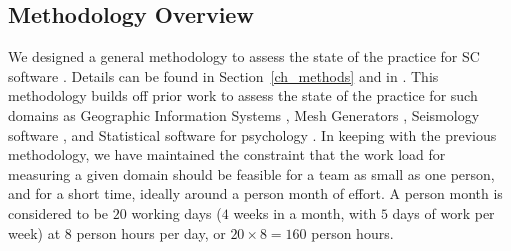 \documentclass[final, 3p, times, authoryear]{elsarticle}
\begin{document}

\subsection{Methodology Overview}

We designed a general methodology to assess the state of the practice for SC
software \citep{SmithEtAl2021}. Details can be found in Section~\ref{ch_methods}
and in \citep{Dong2021}.  This methodology builds off prior work to assess the
state of the practice for such domains as Geographic Information Systems
\citep{smith2018state}, Mesh Generators \citep{smith2016state}, Seismology
software \citep{Smith2018Seismology}, and Statistical software for psychology
\citep{smith2018statistical}.  In keeping with the previous methodology, we have
maintained the constraint that the work load for measuring a given domain should
be feasible for a team as small as one person, and for a short time, ideally
around a person month of effort. A person month is considered to be $20$ working
days ($4$ weeks in a month, with $5$ days of work per week) at $8$ person hours
per day, or $20 \times 8 = 160$ person hours.
\end{document}
